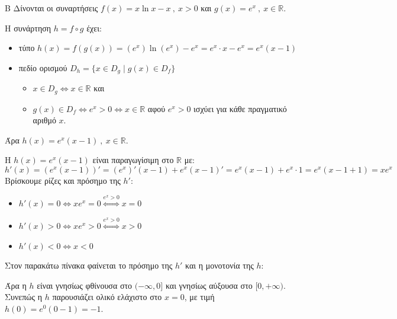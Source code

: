 \begin{thema}{Β}
Δίνονται οι συναρτήσεις $f(x)=x\ln{x}-x\ ,\ x>0$ και $g(x)=e^x\ ,\ x\in\mathbb{R}$.

\begin{erwthma}
\item Η συνάρτηση $h=f\circ g$ έχει:
\begin{itemize}
\item τύπο $h(x) = f(g(x)) = (e^x)\ln(e^x) - e^x = e^x \cdot x - e^x = e^x(x-1)$
\item πεδίο ορισμού $D_h = \{x\in D_g \mid g(x)\in D_f\}$
\begin{itemize}[label={\tiny \faPlay}]
\item $x\in D_g\Leftrightarrow x\in\mathbb{R}$ και
\item $g(x)\in D_f\Leftrightarrow e^x>0 \Leftrightarrow x\in\mathbb{R}$ αφού $e^x>0$ ισχύει για κάθε πραγματικό αριθμό $x$.
\end{itemize}
\end{itemize}
Άρα $h(x) = e^x(x-1)\ ,\ x\in\mathbb{R}$.

\item Η $h(x) = e^x(x-1)$ είναι παραγωγίσιμη στο $\mathbb{R}$ με:
\[h'(x) = (e^x(x-1))' = (e^x)'(x-1) + e^x(x-1)' = e^x(x-1) + e^x\cdot 1 = e^x(x-1+1) = xe^x\]
Βρίσκουμε ρίζες και πρόσημο της $h'$:
\begin{itemize}
    \item $h'(x) = 0 \Leftrightarrow xe^x = 0 \stackrel{e^x>0}{\Leftrightarrow} x = 0$
    \item $h'(x) > 0 \Leftrightarrow xe^x > 0 \stackrel{e^x>0}{\Leftrightarrow} x > 0$
    \item $h'(x) < 0 \Leftrightarrow x < 0$
\end{itemize}
Στον παρακάτω πίνακα φαίνεται το πρόσημο της $h'$ και η μονοτονία της $h$:
\begin{center}
\end{center}
Άρα η $h$ είναι γνησίως φθίνουσα στο $(-\infty, 0]$ και γνησίως αύξουσα στο $[0, +\infty)$. Συνεπώς η $h$ παρουσιάζει ολικό ελάχιστο στο $x=0$, με τιμή $h(0) = e^0(0-1) = -1$.


\end{erwthma}
\end{thema}
